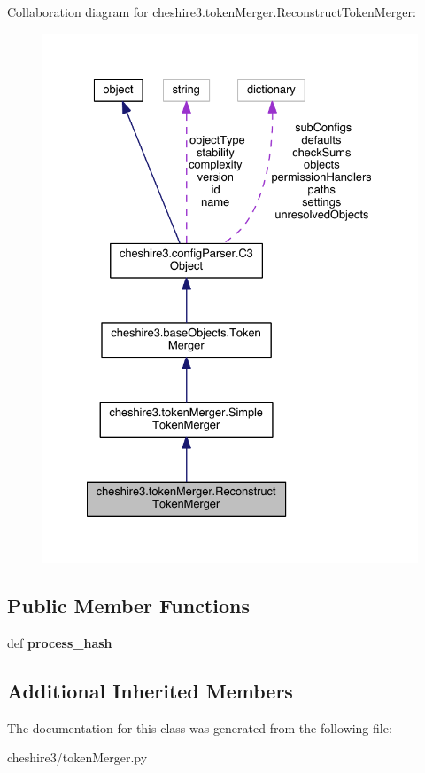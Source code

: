 Collaboration diagram for cheshire3.\-token\-Merger.\-Reconstruct\-Token\-Merger\-:
\nopagebreak
\begin{figure}[H]
\begin{center}
\leavevmode
\includegraphics[width=331pt]{classcheshire3_1_1token_merger_1_1_reconstruct_token_merger__coll__graph}
\end{center}
\end{figure}
\subsection*{Public Member Functions}
\begin{DoxyCompactItemize}
\item 
\hypertarget{classcheshire3_1_1token_merger_1_1_reconstruct_token_merger_a1e45aba6ba77a96820a3a315841bf0b1}{def {\bfseries process\-\_\-hash}}\label{classcheshire3_1_1token_merger_1_1_reconstruct_token_merger_a1e45aba6ba77a96820a3a315841bf0b1}

\end{DoxyCompactItemize}
\subsection*{Additional Inherited Members}


The documentation for this class was generated from the following file\-:\begin{DoxyCompactItemize}
\item 
cheshire3/token\-Merger.\-py\end{DoxyCompactItemize}

